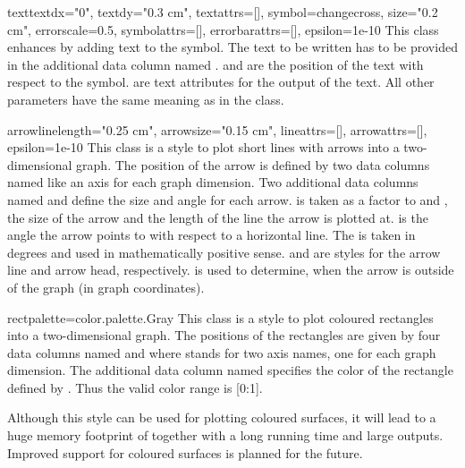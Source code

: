 \begin{classdesc}{text}{textdx="0", textdy="0.3 cm", textattrs=[],
                        symbol=changecross, size="0.2 cm",
                        errorscale=0.5, symbolattrs=[],
                        errorbarattrs=[], epsilon=1e-10}
  This class enhances  by adding text to the symbol. The
  text to be written has to be provided in the additional data column named
  .  and  are the position of the
  text with respect to the symbol.  are text
  attributes for the output of the text. All other parameters have the
  same meaning as in the  class.
\end{classdesc}

\begin{classdesc}{arrow}{linelength="0.25 cm", arrowsize="0.15 cm",
                         lineattrs=[], arrowattrs=[], epsilon=1e-10}
  This class is a style to plot short lines with arrows into a
  two-dimensional graph. The position of the arrow is defined by two
  data columns named like an axis for each graph dimension. Two
  additional data columns named  and  define
  the size and angle for each arrow.  is taken as a factor
  to  and , the size of the arrow and
  the length of the line the arrow is plotted at.  is the
  angle the arrow points to with respect to a horizontal line. The
   is taken in degrees and used in mathematically positive
  sense.  and  are styles for the arrow
  line and arrow head, respectively.  is used to
  determine, when the arrow is outside of the graph (in graph
  coordinates).
\end{classdesc}

\begin{classdesc}{rect}{palette=color.palette.Gray}
  This class is a style to plot coloured rectangles into a
  two-dimensional graph. The positions of the rectangles are given by four
  data columns named  and  where  stands
  for two axis names, one for each graph dimension. The additional
  data column named  specifies the color of the rectangle
  defined by . Thus the valid color range is [0:1].

  \begin{note}
    Although this style can be used for plotting coloured surfaces, it
    will lead to a huge memory footprint of \PyX{} together with a
    long running time and large outputs. Improved support for coloured
    surfaces is planned for the future.
  \end{note}
\end{classdesc}

